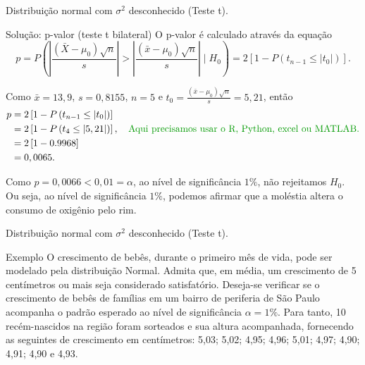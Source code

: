 \documentclass[8pt]{beamer}
\begin{document}
\begin{frame}{Distribuição normal com $\sigma^2$ desconhecido (Teste t).}

\begin{block}{Solução: p-valor (teste t bilateral)}
	O p-valor é calculado através da equação
	$$p=P\left( \left\lvert \frac{(\bar{X} - \mu_0)\sqrt{n}}{s} \right\rvert >  \left\lvert \frac{(\bar{x} - \mu_0)\sqrt{n}}{s}  \right\rvert \mid H_0 \right) = 2 \left[ 1 - P\left( t_{n-1} \leq \lvert t_0 \rvert \right) \right].$$
	
	Como $\bar{x} = 13,9$, $s=0,8155$, $n=5$ e $t_0 = \frac{(\bar{x} -\mu_0)\sqrt{n}}{s} = 5,21$, então
	\begin{align*}
		p &= 2 \left[ 1 - P\left( t_{n-1} \leq \lvert t_0 \rvert \right) \right]\\
		&= 2 \left[ 1 - P\left( t_{4} \leq \lvert 5,21 \rvert \right) \right], \quad \mbox{\textcolor{important}{Aqui precisamos usar o R, Python, excel ou MATLAB.}} \\
		&= 2 \left[ 1- 0.9968 \right]\\
		&= 0,0065.
	\end{align*}
	
	Como $p=0,0066 < 0,01 = \alpha$, ao nível de significância $1\%$, não rejeitamos $H_0$. Ou seja, ao nível de significância $1\%$, podemos afirmar que a moléstia altera o consumo de oxigênio pelo rim.
\end{block}

\end{frame}

\begin{frame}{Distribuição normal com $\sigma^2$ desconhecido (Teste t).}

\large
 \begin{block}{Exemplo}
	O crescimento de bebês, durante o primeiro mês de vida, pode ser modelado pela distribuição Normal. Admita que, em média, um crescimento de 5 centímetros ou mais seja considerado satisfatório. Deseja-se verificar se o crescimento de bebês de famílias em um bairro de periferia de São Paulo acompanha o padrão esperado ao nível de significância $\alpha=1\%$. Para tanto, 10 recém-nascidos na região foram sorteados e sua altura acompanhada, fornecendo as seguintes de crescimento em centímetros: 5,03; 5,02; 4,95; 4,96; 5,01; 4,97; 4,90; 4,91; 4,90 e 4,93.
\end{block}


\normalsize

\end{frame}
\end{document}
